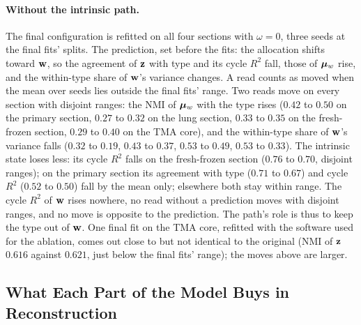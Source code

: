 \paragraph{Without the intrinsic path.} The final configuration is refitted on all four sections with $\omega = 0$, three seeds at the final fits' splits. The prediction, set before the fits: the allocation shifts toward $\mathbf{w}$, so the agreement of $\mathbf{z}$ with type and its cycle $R^2$ fall, those of $\boldsymbol{\mu}_w$ rise, and the within-type share of $\mathbf{w}$'s variance changes. A read counts as moved when the mean over seeds lies outside the final fits' range. Two reads move on every section with disjoint ranges: the NMI of $\boldsymbol{\mu}_w$ with the type rises ($0.42$ to $0.50$ on the primary section, $0.27$ to $0.32$ on the lung section, $0.33$ to $0.35$ on the fresh-frozen section, $0.29$ to $0.40$ on the TMA core), and the within-type share of $\mathbf{w}$'s variance falls ($0.32$ to $0.19$, $0.43$ to $0.37$, $0.53$ to $0.49$, $0.53$ to $0.33$). The intrinsic state loses less: its cycle $R^2$ falls on the fresh-frozen section ($0.76$ to $0.70$, disjoint ranges); on the primary section its agreement with type ($0.71$ to $0.67$) and cycle $R^2$ ($0.52$ to $0.50$) fall by the mean only; elsewhere both stay within range. The cycle $R^2$ of $\mathbf{w}$ rises nowhere, no read without a prediction moves with disjoint ranges, and no move is opposite to the prediction. The path's role is thus to keep the type out of $\mathbf{w}$. One final fit on the TMA core, refitted with the software used for the ablation, comes out close to but not identical to the original (NMI of $\mathbf{z}$ $0.616$ against $0.621$, just below the final fits' range); the moves above are larger.


\subsection{What Each Part of the Model Buys in Reconstruction}
\label{app:recon-modes}

